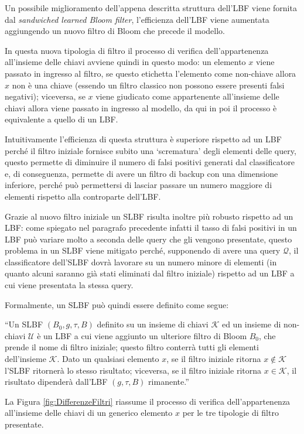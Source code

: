 \documentclass[../../main.tex]{subfiles}
\begin{document}
    Un possibile miglioramento dell'appena descritta struttura dell'LBF viene fornita dal \textit{sandwiched learned Bloom filter}, l'efficienza dell'LBF viene aumentata aggiungendo un nuovo filtro di Bloom che precede il modello.

    In questa nuova tipologia di filtro il processo di verifica dell'appartenenza all'insieme delle chiavi avviene quindi in questo modo: un elemento $x$ viene passato in ingresso al filtro, se questo etichetta l'elemento come non-chiave allora $x$ non è una chiave (essendo un filtro classico non possono essere presenti falsi negativi); viceversa, se $x$ viene giudicato come appartenente all'insieme delle chiavi allora viene passato in ingresso al modello, da qui in poi il processo è equivalente a quello di un LBF.

    Intuitivamente l'efficienza di questa struttura è superiore rispetto ad un LBF perché il filtro iniziale fornisce subito una `scrematura' degli elementi delle query, questo permette di diminuire il numero di falsi positivi generati dal classificatore e, di conseguenza, permette di avere un filtro di backup con una dimensione inferiore, perché può permettersi di lasciar passare un numero maggiore di elementi rispetto alla controparte dell'LBF.

    Grazie al nuovo filtro iniziale un SLBF risulta inoltre più robusto rispetto ad un LBF: come spiegato nel paragrafo precedente infatti il tasso di falsi positivi in un LBF può variare molto a seconda delle query che gli vengono presentate, questo problema in un SLBF viene mitigato perché, supponendo di avere una query $\mathcal{Q}$, il classificatore dell'SLBF dovrà lavorare su un numero minore di elementi (in quanto alcuni saranno già stati eliminati dal filtro iniziale) rispetto ad un LBF a cui viene presentata la stessa query.

    Formalmente, un SLBF può quindi essere definito come segue: 

    ``Un SLBF $(B_0, g, \tau, B)$ definito su un insieme di chiavi $\mathcal{K}$ ed un insieme di non-chiavi $\mathcal{U}$ è un LBF a cui viene aggiunto un ulteriore filtro di Bloom $B_0$, che prende il nome di filtro iniziale; questo filtro conterrà tutti gli elementi dell'insieme $\mathcal{K}$. Dato un qualsiasi elemento $x$, se il filtro iniziale ritorna $x \notin \mathcal{K}$ l'SLBF ritornerà lo stesso risultato; viceversa, se il filtro iniziale ritorna $x \in \mathcal{K}$, il risultato dipenderà dall'LBF $(g, \tau, B)$ rimanente.''

    La Figura \ref{fig:DifferenzeFiltri} riassume il processo di verifica dell'appartenenza all'insieme delle chiavi di un generico elemento $x$ per le tre tipologie di filtro presentate.
    
\end{document}
